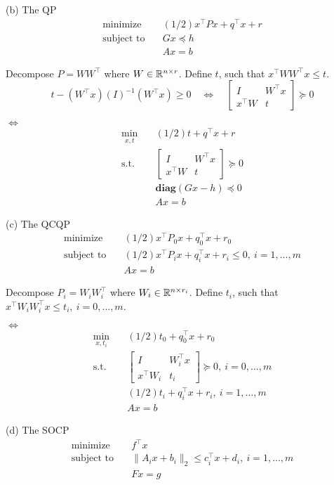 \documentclass[11pt]{article}
\newcommand{\T}{^\top}
\begin{document}
(b) The QP
\begin{align*}
  \text{minimize}\quad & (1/2) x\T P x + q\T x + r\\
  \text{subject to}\quad 
  & Gx \preceq h\\
  & Ax = b
\end{align*}


Decompose $P = WW\T$ where $W\in{{\mathbb{R}}}^{n\times r}$. Define $t$, such that $x\T WW\T x \leq t$.
\[
  t - (W\T x) (I)^{-1} (W\T x) \geq 0
  \quad \Leftrightarrow \quad
  \begin{bmatrix}
    I & W\T x\\ x\T W & t
  \end{bmatrix}
  \succeq 0 
\]


$\Leftrightarrow$
\begin{align*}
  \min_{x, t} \quad & (1/2)t + q\T x + r\\
  \text{s.t.}\quad 
  & \begin{bmatrix}
    I & W\T x\\ x\T W & t
  \end{bmatrix} \succeq 0\\
  & \textbf{diag}(Gx - h) \preceq 0\\
  & Ax = b
\end{align*}


(c) The QCQP
\begin{align*}
  \text{minimize}\quad & (1/2) x\T P_0 x + q_0\T x + r_0\\
  \text{subject to}\quad 
  & (1/2) x\T P_i x + q_i\T x + r_i \leq 0,\ i=1, \dots, m\\
  & Ax = b
\end{align*}


Decompose $P_i = W_i W_i\T$ where $W_i \in{{\mathbb{R}}}^{n\times r_i}$. Define $t_i$, such that $x\T W_iW_i\T x \leq t_i,\ i=0, \dots, m$.

$\Leftrightarrow$
\begin{align*}
  \min_{x, t_i} \quad & (1/2)t_0 + q_0\T x + r_0\\
  \text{s.t.}\quad 
  & \begin{bmatrix}
    I & W_i\T x\\ x\T W_i & t_i
  \end{bmatrix} \succeq 0,\ i=0, \dots, m\\
  & (1/2) t_i + q_i\T x + r_i,\ i=1, \dots, m\\
  & Ax = b
\end{align*}


(d) The SOCP
\begin{align*}
  \text{minimize}\quad & f\T x\\
  \text{subject to}\quad 
  & \|A_ix + b_i\|_2 \leq c_i\T x + d_i, \ i=1, \dots, m\\
  & Fx = g
\end{align*}
\end{document}
